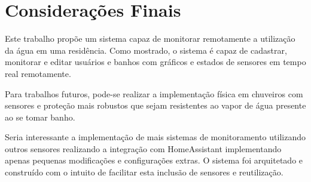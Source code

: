 \chapter{Considerações Finais}

Este trabalho propõe um sistema capaz de monitorar remotamente a utilização da água em uma residência. Como mostrado, o sistema é capaz de cadastrar, monitorar e editar usuários e banhos com gráficos e estados de sensores em tempo real remotamente.

Para trabalhos futuros, pode-se realizar a implementação física em chuveiros com sensores e proteção mais robustos que sejam resistentes ao vapor de água presente ao se tomar banho. 

Seria interessante a implementação de mais sistemas de monitoramento utilizando outros sensores realizando a integração com HomeAssistant implementando apenas pequenas modificações e configurações extras. O sistema foi arquitetado e construído com o intuito de facilitar esta inclusão de sensores e reutilização.